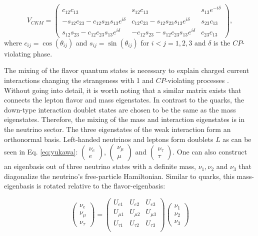 \begin{equation}
V_{CKM} = \begin{pmatrix}
c_{12}c_{13} & s_{12}c_{13} & s_{13}e^{-i\delta} \\
-s_{12}c_{23} - c_{12}s_{23}s_{13} e^{i\delta} & c_{12}c_{23} - s_{12}s_{23}s_{13}e^{i\delta} & s_{23}c_{13} \\
s_{12}s_{23} - c_{12}c_{23}s_{13}e^{i\delta} 
& -c_{12}s_{23} - s_{12}c_{23}s_{13}e^{i\delta} & c_{23}c_{13}
\end{pmatrix},
\end{equation}
where $c_{ij} = \cos\left(\theta_{ij}\right)$ and  $s_{ij} = \sin\left(\theta_{ij}\right)$ for $i<j = 1,2,3$ and $\delta$ is the $CP$-violating phase.

The mixing of the flavor quantum states is necessary to explain charged current interactions changing the strangeness with 1 \cite{Glashow:1970gm} and $CP$-violating processes \cite{1964PhRvL}.\\

\noindent Without going into detail, it is worth noting that a similar matrix exists that connects the lepton flavor and mass eigenstates. In contrast to the quarks, the down-type interaction doublet states are chosen to be the same as the mass eigenstates. Therefore, the mixing of the mass and interaction eigenstates is in the neutrino sector. The three eigenstates of the weak interaction form an orthonormal basis. Left-handed neutrinos and leptons form doublets $L$ as can be seen in Eq. \ref{eq:yukawa}: $\begin{pmatrix}\nu_e \\ e \end{pmatrix}$, $\begin{pmatrix}\nu_\mu \\ \mu \end{pmatrix}$ and $\begin{pmatrix}\nu_\tau \\ \tau \end{pmatrix}$. One can also construct an eigenbasis out of three neutrino states with a definite mass, $\nu_1, \nu_2$ and $\nu_3$ that diagonalize the neutrino's free-particle Hamiltonian. Similar to quarks, this mass-eigenbasis is rotated relative to the flavor-eigenbasis:

\begin{equation}
\begin{pmatrix}
\nu_e \\ \nu_\mu \\ \nu_\tau
\end{pmatrix}
=
\begin{pmatrix}
U_{e1} & U_{e2} & U_{e3} \\
U_{\mu 1} & U_{\mu 2} & U_{\mu 3} \\
U_{\tau 1} & U_{\tau 2} & U_{\tau 3} \\
\end{pmatrix}
\begin{pmatrix}
\nu_1 \\ \nu_2 \\ \nu_3
\end{pmatrix}
\end{equation}

